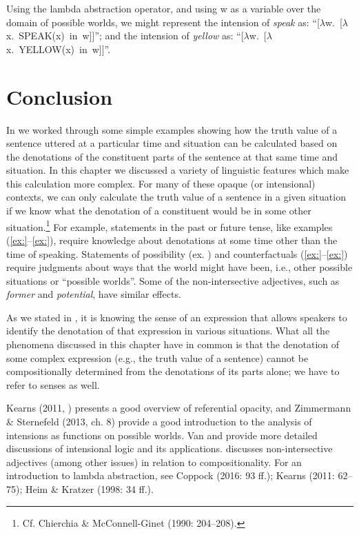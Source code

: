 Using the lambda abstraction operator, and using w as a variable over the domain of possible worlds, we might represent the intension of \textit{speak} as: “[$\lambda $w.~[$\lambda $x.~SPEAK(x)~in~w]]”; and the intension of \textit{yellow} as: “[$\lambda $w.~[$\lambda $x.~YELLOW(x)~in~w]]”.


\section{Conclusion}\label{sec:15.7}

In  we worked through some simple examples showing how the truth value of a sentence uttered at a particular time and situation can be calculated based on the denotations of the constituent parts of the sentence at that same time and situation. In this chapter we discussed a variety of linguistic features which make this calculation more complex. For many of these opaque (or intensional) contexts, we can only calculate the truth value of a sentence in a given situation if we know what the denotation of a constituent would be in some other situation.\footnote{Cf. Chierchia \& McConnell-Ginet (1990: 204–208).} For example, statements in the past or future tense, like examples (\ref{ex:}--\ref{ex:}), require knowledge about denotations at some time other than the time of speaking. Statements of possibility (ex. ) and counterfactuals (\ref{ex:}--\ref{ex:}) require judgments about ways that the world might have been, i.e., other possible situations or “possible worlds”. Some of the non-intersective adjectives, such as \textit{former} and \textit{potential}, have similar effects.



As we stated in , it is knowing the sense of an expression that allows speakers to identify the denotation of that expression in various situations. What all the phenomena discussed in this chapter have in common is that the denotation of some complex expression (e.g., the truth value of a sentence) cannot be compositionally determined from the denotations of its parts alone; we have to refer to senses as well.



\furtherreading



Kearns (2011, ) presents a good overview of referential opacity, and Zimmermann \& Sternefeld (2013, ch. 8) provide a good introduction to the analysis of intensions as functions on possible worlds. Van \citet{Benthem1988} and \citet{Gamut1991b} provide more detailed discussions of intensional logic and its applications. \citet{Partee1995} discusses non-intersective adjectives (among other issues) in relation to compositionality. For an introduction to lambda abstraction, see Coppock (2016: 93 ff.); Kearns (2011: 62–75); Heim \& Kratzer (1998: 34 ff.).